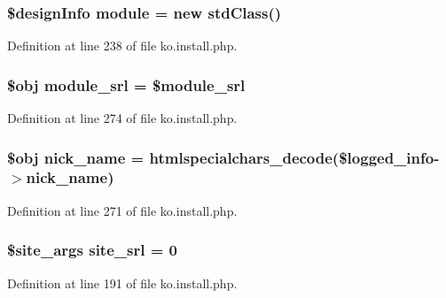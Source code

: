 \subsubsection[{module}]{\setlength{\rightskip}{0pt plus 5cm}\$design\+Info {\bf module} = new std\+Class()}\label{ko_8install_8php_a5c3fc1968f94c2b6a7c60845f284de78}


Definition at line 238 of file ko.\+install.\+php.

\hypertarget{ko_8install_8php_a370bb6450fab1da3e0ed9f484a38b761}{}
\subsubsection[{module\+\_\+srl}]{\setlength{\rightskip}{0pt plus 5cm}\$obj module\+\_\+srl = \$module\+\_\+srl}\label{ko_8install_8php_a370bb6450fab1da3e0ed9f484a38b761}


Definition at line 274 of file ko.\+install.\+php.

\hypertarget{ko_8install_8php_a151ecae87a1f3d7e257aa089803086bd}{}
\subsubsection[{nick\+\_\+name}]{\setlength{\rightskip}{0pt plus 5cm}\$obj nick\+\_\+name = htmlspecialchars\+\_\+decode(\$logged\+\_\+info-\/$>$nick\+\_\+name)}\label{ko_8install_8php_a151ecae87a1f3d7e257aa089803086bd}


Definition at line 271 of file ko.\+install.\+php.

\hypertarget{ko_8install_8php_a8b1406b4ad1048041558dce6bfe89004}{}
\subsubsection[{site\+\_\+srl}]{\setlength{\rightskip}{0pt plus 5cm}\$site\+\_\+args site\+\_\+srl = 0}\label{ko_8install_8php_a8b1406b4ad1048041558dce6bfe89004}


Definition at line 191 of file ko.\+install.\+php.

\hypertarget{ko_8install_8php_ab0f2b49fdb57754496b34f6b880cdeaf}{}

